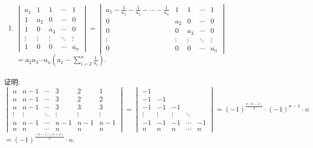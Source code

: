 \begin{enumerate}
			\item %
			      $\begin{vmatrix}
					      a_1    & 1      & 1      & \cdots & 1      \\
					      1      & a_2    & 0      & \cdots & 0      \\
					      1      & 0      & a_3    & \cdots & 0      \\
					      \vdots & \vdots & \vdots & \ddots & \vdots \\
					      1      & 0      & 0      & \cdots & a_n
				      \end{vmatrix} = \begin{vmatrix}
					      a_1 - \frac{1}{a_2} - \frac{1}{a_3} - \cdots - \frac{1}{a_n} & 1      & 1      & \cdots & 1      \\
					      0                                                            & a_2    & 0      & \cdots & 0      \\
					      0                                                            & 0      & a_3    & \cdots & 0      \\
					      \vdots                                                       & \vdots & \vdots & \ddots & \vdots \\
					      0                                                            & 0      & 0      & \cdots & a_n
				      \end{vmatrix}$
			      $= a_2 a_3 \cdots a_n \left(a_1 - \sum_{i=2}^{n} \frac{1}{a_i}\right)$.
		\end{enumerate}


	\paragraph{} %
		证明: $\begin{vmatrix}
				n      & n-1    & \cdots & 3      & 2      & 1      \\
				n      & n-1    & \cdots & 3      & 2      & 2      \\
				n      & n-1    & \cdots & 3      & 3      & 3      \\
				\vdots & \vdots & \ddots & \vdots & \vdots & \vdots \\
				n      & n-1    & \cdots & n-1    & n-1    & n-1    \\
				n      & n      & \cdots & n      & n      & n
			\end{vmatrix} = \begin{vmatrix}
				-1     &        &        &        &    \\
				-1     & -1     &        &        &    \\
				-1     & -1     & -1     &        &    \\
				\vdots & \vdots & \vdots & \ddots &    \\
				-1     & -1     & -1     & \cdots & -1 \\
				n      & n      & n      & \cdots & n
			\end{vmatrix} = (-1)^{\frac{n(n-1)}{2}} \cdot (-1)^{n-1} \cdot n$
		$= (-1)^{\frac{(n-1)(n+2)}{2}} \cdot n$.


